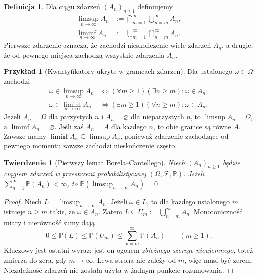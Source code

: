 \documentclass[11pt,a4paper,oneside]{report}
\numberwithin{equation}{chapter}
\theoremstyle{plain}
\newtheorem{twierdzenie}{Twierdzenie}[chapter]
\theoremstyle{definition}
\newtheorem{definicja}{Definicja}[chapter]
\newtheorem{przyklad}{Przykład}[chapter]
\theoremstyle{remark}
\newcommand{\Prob}{\mathbb{P}}
\begin{document}
\begin{definicja}
Dla ciągu zdarzeń $(A_n)_{n\geq1}$ definiujemy
\begin{align*}
\limsup_{n\to\infty}A_n
&:=\bigcap_{m=1}^\infty\bigcup_{n=m}^\infty A_n,\\
\liminf_{n\to\infty}A_n
&:=\bigcup_{m=1}^\infty\bigcap_{n=m}^\infty A_n.
\end{align*}
Pierwsze zdarzenie oznacza, że zachodzi nieskończenie wiele zdarzeń $A_n$,
a drugie, że od pewnego miejsca zachodzą wszystkie zdarzenia $A_n$.
\end{definicja}


\begin{przyklad}[Kwantyfikatory ukryte w granicach zdarzeń]
Dla ustalonego $\omega\in\Omega$ zachodzi
\begin{align*}
\omega\in\limsup_{n\to\infty}A_n
&\iff (\forall m\geq1)(\exists n\geq m):\omega\in A_n,\\
\omega\in\liminf_{n\to\infty}A_n
&\iff (\exists m\geq1)(\forall n\geq m):\omega\in A_n.
\end{align*}
Jeżeli $A_n=\Omega$ dla parzystych $n$ i $A_n=\varnothing$
dla nieparzystych $n$, to $\limsup A_n=\Omega$, a
$\liminf A_n=\varnothing$. Jeśli zaś $A_n=A$ dla każdego $n$,
to obie granice są równe $A$. Zawsze mamy
$\liminf A_n\subseteq\limsup A_n$, ponieważ zdarzenie
zachodzące od pewnego momentu zawsze zachodzi nieskończenie często.
\end{przyklad}

\begin{twierdzenie}[Pierwszy lemat Borela--Cantellego]
Niech $(A_n)_{n\geq1}$ będzie ciągiem zdarzeń w przestrzeni
probabilistycznej $(\Omega,\mathcal F,\Prob)$.
Jeżeli $\sum_{n=1}^\infty\Prob(A_n)<\infty$, to
$\Prob(\limsup_{n\to\infty}A_n)=0$.
\end{twierdzenie}
\begin{proof}
Niech $L=\limsup_{n\to\infty}A_n$.
Jeżeli $\omega\in L$, to dla każdego ustalonego $m$
istnieje $n\geq m$ takie, że $\omega\in A_n$.
Zatem $L\subseteq U_m:=\bigcup_{n=m}^\infty A_n$.
Monotoniczność miary i nierówność sumy dają
\[
0\leq\Prob(L)\leq\Prob(U_m)
\leq\sum_{n=m}^\infty\Prob(A_n)
\qquad(m\geq1).
\]
Kluczowy jest ostatni wyraz: jest on ogonem 
\emph{zbieżnego szeregu nieujemnego}, toteż zmierza
do zera, gdy $m\to\infty$. Lewa strona nie zależy od $m$,
więc musi być zerem. Niezależność zdarzeń nie została
użyta w żadnym punkcie rozumowania.
\end{proof}
\end{document}
